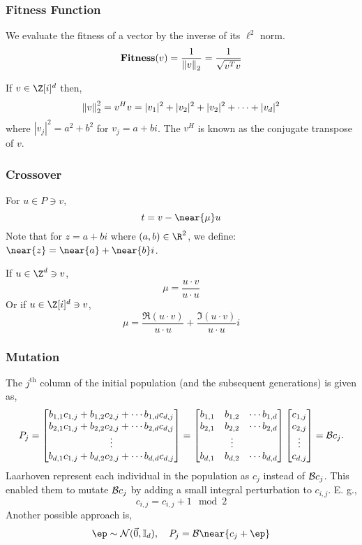 \documentclass{homework}
\begin{document}
\subsubsection{Fitness Function} We evaluate the fitness of a vector
by the inverse of its $\ell^2$ norm.
\[
  \mathbf{Fitness}(v) = \frac{1}{\left\lVert v\right\rVert_2} = \frac{1}{\sqrt{v^Tv}}
\]

If $v \in \G^d$ then,
\[
  \left\lVert v\right\rVert_2^2 = v^Hv = |v_1|^2 + |v_2|^2 +  |v_2|^2 + \cdots + |v_d|^2
\]
where $|v_j|^2 = a^2 + b^2$ for $v_j = a + bi$. The $v^H$ is known as
the conjugate transpose of $v$.

\subsubsection{Crossover} For $u \in P \ni v$,
\[
  t = v - \near{\mu} u
\]
Note that for $z = a + bi$ where $(a, b) \in \R^2$, we define:
$\near{z} = \near{a} + \near{b}i$.

If $u \in \Z^d \ni v$,
\[
  \mu = \frac{u\cdot v}{u\cdot u}
\]
Or if $u \in \G^d \ni v$,
\[
  \mu = \frac{\Re(u\cdot v)}{u\cdot u} + \frac{\Im(u\cdot v)}{u\cdot u}i
\]

\subsubsection{Mutation} The $j^\text{th}$ column of the initial
population (and the subsequent generations) is given as,
\[
  P_j =
  \begin{bmatrix}
    b_{1,1}c_{1,j} + b_{1,2}c_{2,j} + \cdots  b_{1,d}c_{d,j} \\
    b_{2,1}c_{1,j} + b_{2,2}c_{2,j} + \cdots  b_{2,d}c_{d,j} \\
    \vdots \\
    b_{d,1}c_{1,j} + b_{d,2}c_{2,j} + \cdots  b_{d,d}c_{d,j}
  \end{bmatrix}
  =
  \begin{bmatrix}
    b_{1,1} & b_{1,2} & \cdots  b_{1,d} \\
    b_{2,1} & b_{2,2} & \cdots  b_{2,d} \\
            & \vdots  &                 \\
    b_{d,1} & b_{d,2} & \cdots  b_{d,d}
  \end{bmatrix}
  \begin{bmatrix}
    c_{1,j} \\
    c_{2,j} \\
    \vdots \\
    c_{d,j}
  \end{bmatrix}
  =
  \mathcal{B} c_j.
\]
Laarhoven \cite{DBLP:journals/corr/abs-1907-04629} represent each
individual in the population as $c_j$ instead of $\mathcal{B} c_j$. This
enabled them to mutate $\mathcal{B} c_j$ by adding a small integral
perturbation to $c_{i,j}$. E. g.,
\[
  c_{i,j} = c_{i,j}+1 \mod 2
\]
Another possible approach is,
\[
  \ep \sim \mathcal{N}(\vec{0}, \mathbb{I}_d), \quad P_j = \B\near{c_j + \ep}
\]
\end{document}
